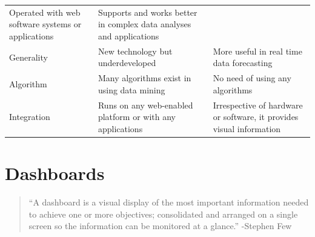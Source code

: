 \documentclass[]{book}
\theoremstyle{definition}
\theoremstyle{definition}
\theoremstyle{definition}
\theoremstyle{remark}
\begin{document}
\begin{longtable}[]{@{}lll@{}}
\begin{minipage}[t]{0.41\columnwidth}
Operated with web software systems or applications\strut
\end{minipage} & \begin{minipage}[t]{0.41\columnwidth}\raggedright\strut
Supports and works better in complex data analyses and
applications\strut
\end{minipage}\tabularnewline
\begin{minipage}[t]{0.08\columnwidth}\raggedright\strut
Generality\strut
\end{minipage} & \begin{minipage}[t]{0.41\columnwidth}\raggedright\strut
New technology but underdeveloped\strut
\end{minipage} & \begin{minipage}[t]{0.41\columnwidth}\raggedright\strut
More useful in real time data forecasting\strut
\end{minipage}\tabularnewline
\begin{minipage}[t]{0.08\columnwidth}\raggedright\strut
Algorithm\strut
\end{minipage} & \begin{minipage}[t]{0.41\columnwidth}\raggedright\strut
Many algorithms exist in using data mining\strut
\end{minipage} & \begin{minipage}[t]{0.41\columnwidth}\raggedright\strut
No need of using any algorithms\strut
\end{minipage}\tabularnewline
\begin{minipage}[t]{0.08\columnwidth}\raggedright\strut
Integration\strut
\end{minipage} & \begin{minipage}[t]{0.41\columnwidth}\raggedright\strut
Runs on any web-enabled platform or with any applications\strut
\end{minipage} & \begin{minipage}[t]{0.41\columnwidth}\raggedright\strut
Irrespective of hardware or software, it provides visual
information\strut
\end{minipage}\tabularnewline
\bottomrule
\end{longtable}

\section{Dashboards}\label{dashboards}

\begin{quote}
``A dashboard is a visual display of the most important information
needed to achieve one or more objectives; consolidated and arranged on a
single screen so the information can be monitored at a glance.''
-Stephen Few
\end{quote}
\end{document}

